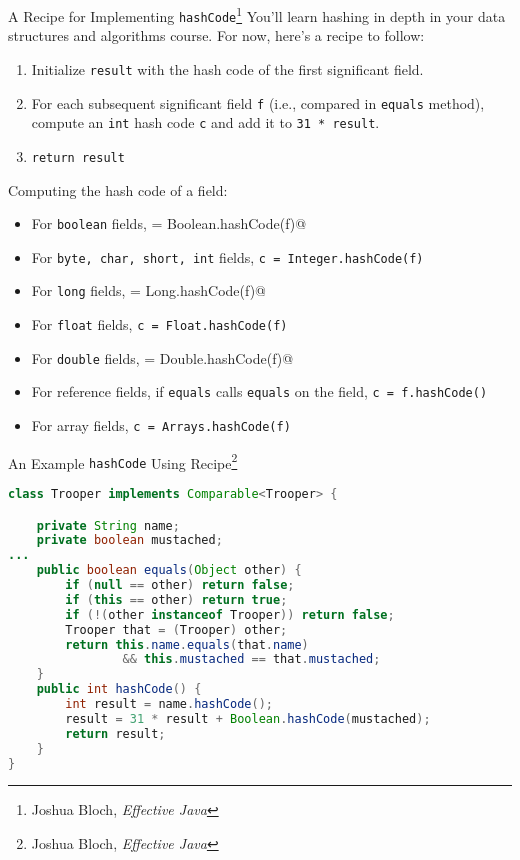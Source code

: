 \documentclass{beamer}
\begin{document}
\begin{frame}[fragile]{A Recipe for Implementing {\tt hashCode}\footnote{Joshua Bloch, {\it Effective Java}}}
\vspace{-.05in}
You'll learn hashing in depth in your data structures and algorithms course.  For now, here's a recipe to follow:

\begin{enumerate}
\item Initialize {\tt result} with the hash code of the first significant field.
\item For each subsequent significant field {\tt f} (i.e., compared in {\tt equals} method), compute an {\tt int} hash code {\tt c} and add it to {\tt 31 * result}.
\item {\tt return result}
\end{enumerate}
Computing the hash code of a field:
\begin{itemize}
\item For {\tt boolean} fields, \verb@c = Boolean.hashCode(f)@
\item For {\tt byte, char, short, int} fields, {\tt c = Integer.hashCode(f)}
\item For {\tt long} fields, \verb@c = Long.hashCode(f)@
\item For {\tt float} fields, {\tt c = Float.hashCode(f)}
\item For {\tt double} fields, \verb@c = Double.hashCode(f)@
\item For reference fields, if {\tt equals} calls {\tt equals} on the field, {\tt c = f.hashCode()}
\item For array fields, {\tt c = Arrays.hashCode(f)}
\end{itemize}


\end{frame}

\begin{frame}[fragile]{An Example {\tt hashCode} Using Recipe\footnote{Joshua Bloch, {\it Effective Java}}}

\begin{lstlisting}[language=Java]
class Trooper implements Comparable<Trooper> {

    private String name;
    private boolean mustached;
...
    public boolean equals(Object other) {
        if (null == other) return false;
        if (this == other) return true;
        if (!(other instanceof Trooper)) return false;
        Trooper that = (Trooper) other;
        return this.name.equals(that.name)
                && this.mustached == that.mustached;
    }
    public int hashCode() {
        int result = name.hashCode();
        result = 31 * result + Boolean.hashCode(mustached);
        return result;
    }
}
\end{lstlisting}

\end{frame}
\end{document}
